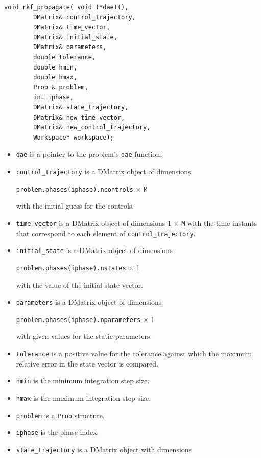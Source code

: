 \documentclass[a4paper,11pt]{report}    %
\begin{document}
\begin{verbatim}
void rkf_propagate( void (*dae)(), 
        DMatrix& control_trajectory, 
        DMatrix& time_vector,
        DMatrix& initial_state,
        DMatrix& parameters,
        double tolerance, 
        double hmin,
        double hmax,
        Prob & problem,  
        int iphase,
        DMatrix& state_trajectory,
        DMatrix& new_time_vector,
        DMatrix& new_control_trajectory,
        Workspace* workspace);
\end{verbatim}

\begin{itemize}
 \item \verb|dae| is a pointer to the problem's \verb|dae| function;
 \item \verb|control_trajectory| is a DMatrix object of dimensions 

\verb|problem.phases(iphase).ncontrols| $\times$ \verb|M| 

\noindent with the initial guess for the controls.
 \item \verb|time_vector| is a DMatrix object of dimensions 1 $\times$ \verb|M| with the time instants that
correspond to each element of \verb|control_trajectory|.
 \item  \verb|initial_state| is a DMatrix object of dimensions 

\verb|problem.phases(iphase).nstates| $\times$ 1  

\noindent with the  value of the initial state vector.
\item \verb|parameters| is a DMatrix object of dimensions 

\verb|problem.phases(iphase).nparameters| $\times$ 1 

\noindent with given values for the static parameters.

\item \verb|tolerance| is a positive value for the tolerance against which the maximum relative error in the state vector
is compared.

\item \verb|hmin| is the minimum integration step size.

\item \verb|hmax| is the maximum integration step size.


\item \verb|problem| is a \verb|Prob| structure.
\item \verb|iphase| is the phase index.
\item \verb|state_trajectory| is a DMatrix object with dimensions 


\end{itemize}
\end{document}
